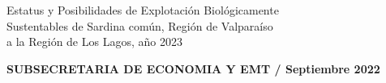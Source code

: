\documentclass[12pt, oneside]{article} %
\begin{document}
\begin{titlepage}
\begin{minipage}{\textwidth}
{            \centering \fontsize{9pt}{8pt}\selectfont
            \vspace*{-5mm} 
            \hfill \begin{flushright}
            Estatus y Posibilidades de Explotación Biológicamente \\ Sustentables de Sardina común,  Región de Valparaíso \\ a la Región de Los Lagos, año 2023
			\end{flushright} 
              
			\centering \fontsize{10pt}{8pt}\selectfont
            \vspace*{2mm} 
            \hfill \textbf{SUBSECRETARIA DE ECONOMIA Y EMT / Septiembre 2022}
                        
            \vspace*{0.2cm}
        }
    \end{minipage}

\end{titlepage}
\endgroup
\end{document}
